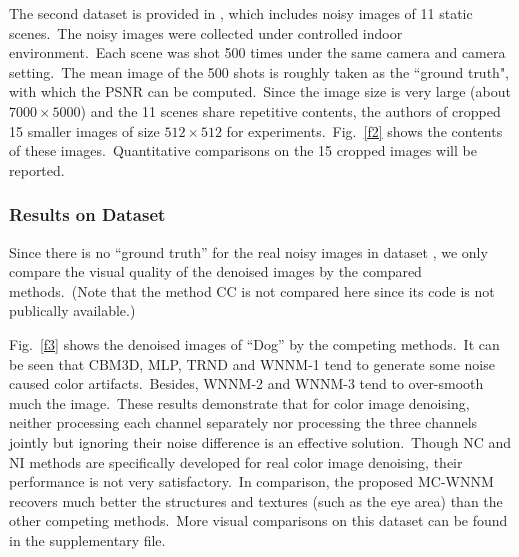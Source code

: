 The second dataset is provided in \cite{crosschannel2016}, which includes noisy images of 11 static scenes.\ The noisy images were collected under controlled indoor environment.\ Each scene was shot 500 times under the same camera and camera setting.\ The mean image of the 500 shots is roughly taken as the ``ground truth", with which the PSNR can be computed.\ Since the image size is very large (about $7000\times5000$) and the 11 scenes share repetitive contents, the authors of \cite{crosschannel2016} cropped 15 smaller images of size $512\times512$ for experiments.\ Fig.\ \ref{f2} shows the contents of these images.\ Quantitative comparisons on the 15 cropped images will be reported. 

\subsubsection{Results on Dataset \cite{ncwebsite}}

\quad Since there is no ``ground truth'' for the real noisy images in dataset \cite{ncwebsite}, we only compare the visual quality of the denoised images by the compared methods.\ (Note that the method CC \cite{crosschannel2016} is not compared here since its code is not publically available.)

Fig.\ \ref{f3} shows the denoised images of ``Dog'' by the competing methods.\ It can be seen that CBM3D, MLP, TRND and WNNM-1 tend to generate some noise caused color artifacts.\ Besides, WNNM-2 and WNNM-3 tend to over-smooth much the image.\ These results demonstrate that for color image denoising, neither processing each channel separately nor processing the three channels jointly but ignoring their noise difference is an effective solution.\ Though NC and NI methods are specifically developed for real color image denoising, their performance is not very satisfactory.\ In comparison, the proposed MC-WNNM recovers much better the structures and textures (such as the eye area) than the other competing methods.\ More visual comparisons on this dataset can be found in the supplementary file.

